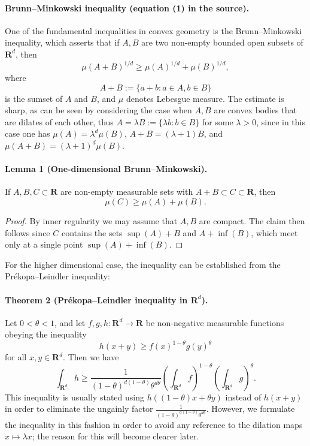 
\paragraph{Brunn--Minkowski inequality (equation (1) in the source).}
One of the fundamental inequalities in convex geometry is the Brunn--Minkowski inequality, which asserts that if $A,B$ are two non-empty bounded open subsets of $\mathbf R^d$, then
\begin{equation}
\mu(A+B)^{1/d}\geq\mu(A)^{1/d}+\mu(B)^{1/d},\tag{1}
\end{equation}
where
\[
A+B:=\{a+b:a\in A,b\in B\}
\]
is the sumset of $A$ and $B$, and $\mu$ denotes Lebesgue measure. The estimate is sharp, as can be seen by considering the case when $A,B$ are convex bodies that are dilates of each other, thus $A=\lambda B:=\{\lambda b:b\in B\}$ for some $\lambda>0$, since in this case one has $\mu(A)=\lambda^d\mu(B)$, $A+B=(\lambda+1)B$, and $\mu(A+B)=(\lambda+1)^d\mu(B)$.

\paragraph{Lemma 1 (One-dimensional Brunn--Minkowski).}
If $A,B,C\subset\mathbf R$ are non-empty measurable sets with $A+B\subset C\subset\mathbf R$, then
\[\mu(C)\geq\mu(A)+\mu(B).\]
\begin{proof}
By inner regularity we may assume that $A,B$ are compact. The claim then follows since $C$ contains the sets $\sup(A)+B$ and $A+\inf(B)$, which meet only at a single point $\sup(A)+\inf(B)$.
\end{proof}
For the higher dimensional case, the inequality can be established from the Pr\'ekopa--Leindler inequality:

\paragraph{Theorem 2 (Pr\'ekopa--Leindler inequality in $\mathbf R^d$).}
Let $0<\theta<1$, and let $f,g,h:\mathbf R^d\to\mathbf R$ be non-negative measurable functions obeying the inequality
\begin{equation}
h(x+y)\geq f(x)^{1-\theta}g(y)^\theta\tag{2}
\end{equation}
for all $x,y\in\mathbf R^d$. Then we have
\begin{equation}
\int_{\mathbf R^d}h\geq
\frac{1}{(1-\theta)^{d(1-\theta)}\theta^{d\theta}}
\left(\int_{\mathbf R^d}f\right)^{1-\theta}
\left(\int_{\mathbf R^d}g\right)^\theta.\tag{3}
\end{equation}
This inequality is usually stated using $h((1-\theta)x+\theta y)$ instead of $h(x+y)$ in order to eliminate the ungainly factor $\frac{1}{(1-\theta)^{d(1-\theta)}\theta^{d\theta}}$. However, we formulate the inequality in this fashion in order to avoid any reference to the dilation maps $x\mapsto\lambda x$; the reason for this will become clearer later.

